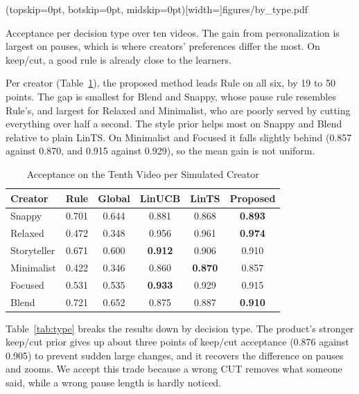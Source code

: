 \documentclass{ieeeaccess}
\begin{document}
\Figure[t!](topskip=0pt, botskip=0pt, midskip=0pt)[width=\textwidth]{figures/by_type.pdf}
{\parbox[t]{0.91\textwidth}{\raggedright Acceptance per decision type over ten videos. The gain from personalization is largest on pauses, which is where creators' preferences differ the most. On keep/cut, a good rule is already close to the learners.}\label{fig:bytype}}


Per creator (Table~\ref{tab:persona}), the proposed method leads Rule on all six, by 19 to 50 points. The gap is smallest for Blend and Snappy, whose pause rule resembles Rule's, and largest for Relaxed and Minimalist, who are poorly served by cutting everything over half a second. The style prior helps most on Snappy and Blend relative to plain LinTS. On Minimalist and Focused it falls slightly behind (0.857 against 0.870, and 0.915 against 0.929), so the mean gain is not uniform.

\begin{table}[t]
\caption{Acceptance on the Tenth Video per Simulated Creator}
\label{tab:persona}
\setlength{\tabcolsep}{3pt}
\centering
\begin{tabular}{|l|c|c|c|c|c|}
\hline
Creator & Rule & Global & LinUCB & LinTS & Proposed \\
\hline
Snappy & 0.701 & 0.644 & 0.881 & 0.868 & \textbf{0.893} \\
Relaxed & 0.472 & 0.348 & 0.956 & 0.961 & \textbf{0.974} \\
Storyteller & 0.671 & 0.600 & \textbf{0.912} & 0.906 & 0.910 \\
Minimalist & 0.422 & 0.346 & 0.860 & \textbf{0.870} & 0.857 \\
Focused & 0.531 & 0.535 & \textbf{0.933} & 0.929 & 0.915 \\
Blend & 0.721 & 0.652 & 0.875 & 0.887 & \textbf{0.910} \\
\hline
\end{tabular}
\end{table}

Table~\ref{tab:type} breaks the results down by decision type. The product's stronger keep/cut prior gives up about three points of keep/cut acceptance (0.876 against 0.905) to prevent sudden large changes, and it recovers the difference on pauses and zooms. We accept this trade because a wrong CUT removes what someone said, while a wrong pause length is hardly noticed.
\end{document}
